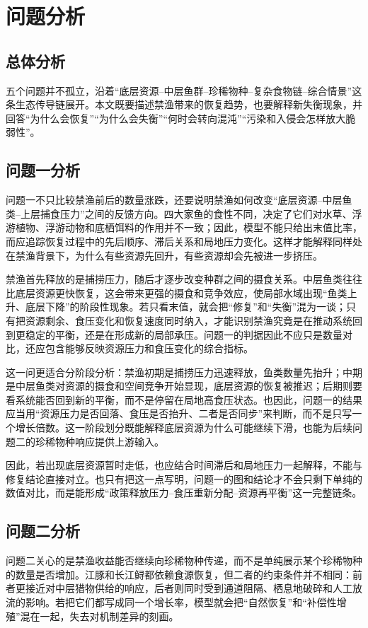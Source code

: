 \section{问题分析}
\subsection{总体分析}
五个问题并不孤立，沿着“底层资源--中层鱼群--珍稀物种--复杂食物链--综合情景”这条生态传导链展开。本文既要描述禁渔带来的恢复趋势，也要解释新失衡现象，并回答“为什么会恢复”“为什么会失衡”“何时会转向混沌”“污染和入侵会怎样放大脆弱性”。

\subsection{问题一分析}
问题一不只比较禁渔前后的数量涨跌，还要说明禁渔如何改变“底层资源--中层鱼类--上层捕食压力”之间的反馈方向。四大家鱼的食性不同，决定了它们对水草、浮游植物、浮游动物和底栖饵料的作用并不一致；因此，模型不能只给出末值比率，而应追踪恢复过程中的先后顺序、滞后关系和局地压力变化。这样才能解释同样处在禁渔背景下，为什么有些资源先回升，有些资源却会先被进一步挤压。

禁渔首先释放的是捕捞压力，随后才逐步改变种群之间的摄食关系。中层鱼类往往比底层资源更快恢复，这会带来更强的摄食和竞争效应，使局部水域出现“鱼类上升、底层下降”的阶段性现象。若只看末值，就会把“修复”和“失衡”混为一谈；只有把资源剩余、食压变化和恢复速度同时纳入，才能识别禁渔究竟是在推动系统回到更稳定的平衡，还是在形成新的局部承压。问题一的判据因此不应只是数量对比，还应包含能够反映资源压力和食压变化的综合指标。

这一问更适合分阶段分析：禁渔初期是捕捞压力迅速释放，鱼类数量先抬升；中期是中层鱼类对资源的摄食和空间竞争开始显现，底层资源的恢复被推迟；后期则要看系统能否回到新的平衡，而不是停留在局地高食压状态。也因此，问题一的结果应当用“资源压力是否回落、食压是否抬升、二者是否同步”来判断，而不是只写一个增长倍数。这一阶段划分既能解释底层资源为什么可能继续下滑，也能为后续问题二的珍稀物种响应提供上游输入。

因此，若出现底层资源暂时走低，也应结合时间滞后和局地压力一起解释，不能与修复结论直接对立。也只有把这一点写明，问题一的图和结论才不会只剩下单纯的数值对比，而是能形成“政策释放压力--食压重新分配--资源再平衡”这一完整链条。

\subsection{问题二分析}
问题二关心的是禁渔收益能否继续向珍稀物种传递，而不是单纯展示某个珍稀物种的数量是否增加。江豚和长江鲟都依赖食源恢复，但二者的约束条件并不相同：前者更接近对中层猎物供给的响应，后者则同时受到通道阻隔、栖息地破碎和人工放流的影响。若把它们都写成同一个增长率，模型就会把“自然恢复”和“补偿性增殖”混在一起，失去对机制差异的刻画。


